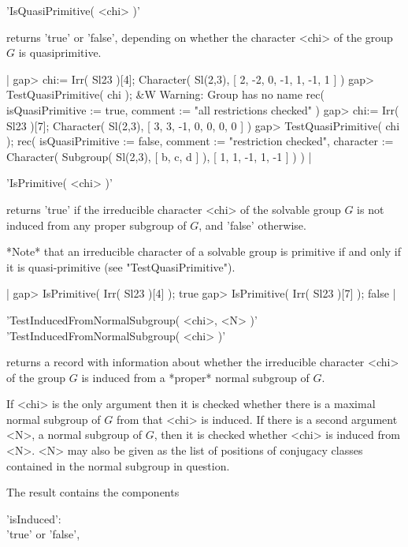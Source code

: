 'IsQuasiPrimitive( <chi> )'%

returns 'true' or 'false', depending on whether the character <chi> of the
group $G$ is quasiprimitive.

|    gap> chi:= Irr( Sl23 )[4];
    Character( Sl(2,3), [ 2, -2, 0, -1, 1, -1, 1 ] )
    gap> TestQuasiPrimitive( chi );
    &W  Warning: Group has no name
    rec(
      isQuasiPrimitive := true,
      comment := "all restrictions checked" )
    gap> chi:= Irr( Sl23 )[7];
    Character( Sl(2,3), [ 3, 3, -1, 0, 0, 0, 0 ] )
    gap> TestQuasiPrimitive( chi );
    rec(
      isQuasiPrimitive := false,
      comment := "restriction checked",
      character := Character( Subgroup( Sl(2,3), [ b, c, d ] ), 
        [ 1, 1, -1, 1, -1 ] ) ) |


'IsPrimitive( <chi> )'

returns 'true' if the irreducible character <chi> of the solvable group $G$
is not induced from any proper subgroup of $G$, and 'false' otherwise.

*Note* that an irreducible character of a solvable group is primitive if and
only if it is quasi-primitive (see "TestQuasiPrimitive").

|    gap> IsPrimitive( Irr( Sl23 )[4] );
    true
    gap> IsPrimitive( Irr( Sl23 )[7] );
    false |


'TestInducedFromNormalSubgroup( <chi>, <N> )'\\
'TestInducedFromNormalSubgroup( <chi> )'

returns a record with information about whether the irreducible character
<chi> of the group $G$ is induced from a *proper* normal subgroup of $G$.

If <chi> is the only argument then it is checked whether there is a
maximal normal subgroup of $G$ from that <chi> is induced.  If there
is a second argument <N>, a normal subgroup of $G$, then it is checked
whether <chi> is induced from <N>.
<N> may also be given as the list of positions of conjugacy classes
contained in the normal subgroup in question.

The result contains the components

'isInduced': \\ 'true' or 'false',

